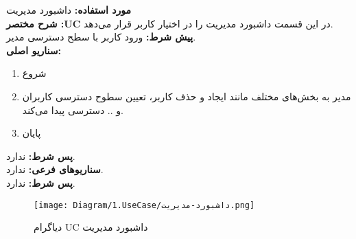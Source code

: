 \textbf{مورد استفاده:}
داشبورد مدیریت
\\
\textbf{شرح مختصر :UC}
در این قسمت داشبورد مدیریت را در اختیار کاربر قرار می‌دهد.
\\
\textbf{پيش شرط:}
ورود کاربر با سطح دسترسی مدیر.
\\
\textbf{سناريو اصلی:}
\begin{enumerate}
	\item
	شروع
	\item
	مدیر به بخش‌های مختلف مانند ایجاد و حذف کاربر، تعیین سطوح دسترسی کاربران و .. دسترسی پیدا می‌کند.
	\item
	پایان
\end{enumerate}

\noindent
\textbf{پس شرط:}
ندارد.
\\
\textbf{سناريوهای فرعی:}
ندارد.
\\
\textbf{پس شرط:}
ندارد.


\begin{figure}[H]
	\centering
	\texttt{[image: Diagram/1.UseCase/داشبورد-مدیریت.png]}
	\caption{دیاگرام UC داشبورد مدیریت}
	\label{fig:uc:داشبورد-مدیریت}
\end{figure}